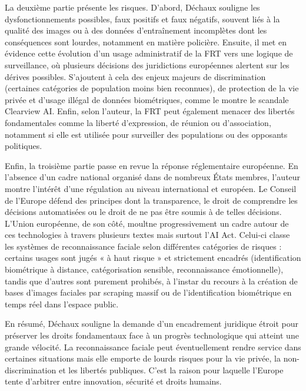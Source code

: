 \documentclass[11pt]{article}
\begin{document}
La deuxième partie présente les risques. D’abord, Déchaux souligne les dysfonctionnements possibles, faux positifs et faux 
négatifs, souvent liés à la qualité des images ou à des données d’entraînement incomplètes dont les conséquences sont lourdes, 
notamment en matière policière. Ensuite, il met en évidence cette évolution d’un usage administratif de la FRT vers une logique 
de surveillance, où plusieurs décisions des juridictions européennes alertent sur les dérives possibles. S’ajoutent à cela des 
enjeux majeurs de discrimination (certaines catégories de population moins bien reconnues), de protection de la vie privée et 
d’usage illégal de données biométriques, comme le montre le scandale Clearview AI. Enfin, selon l’auteur, la FRT peut également 
menacer des libertés fondamentales comme la liberté d’expression, de réunion ou d’association, notamment si elle est utilisée 
pour surveiller des populations ou des opposants politiques.

Enfin, la troisième partie passe en revue la réponse réglementaire européenne. En l’absence d’un cadre national organisé dans de 
nombreux États membres, l’auteur montre l’intérêt d’une régulation au niveau international et européen. Le Conseil de l’Europe 
défend des principes dont la transparence, le droit de comprendre les décisions automatisées ou le droit de ne pas être soumis à 
de telles décisions. L’Union européenne, de son côté, moultne progressivement un cadre autour de ces technologies à travers 
plusieurs textes mais surtout l’AI Act. Celui-ci classe les systèmes de reconnaissance faciale selon différentes catégories de 
risques : certains usages sont jugés « à haut risque » et strictement encadrés (identification biométrique à distance, 
catégorisation sensible, reconnaissance émotionnelle), tandis que d’autres sont purement prohibés, à l’instar du recours à la 
création de bases d’images faciales par scraping massif ou de l’identification biométrique en temps réel dans l’espace public.

En résumé, Déchaux souligne la demande d’un encadrement juridique étroit pour préserver les droits fondamentaux face à un 
progrès technologique qui atteint une grande vélocité. La reconnaissance faciale peut éventuellement rendre service dans 
certaines situations mais elle emporte de lourds risques pour la vie privée, la non-discrimination et les libertés publiques. 
C’est la raison pour laquelle l’Europe tente d’arbitrer entre innovation, sécurité et droits humains.
\end{document}
